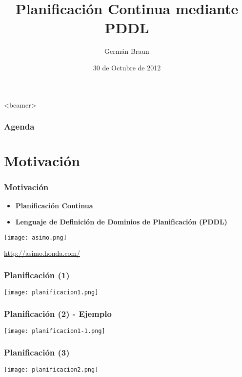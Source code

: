 \documentclass[bigger]{beamer}
\title{Planificación Continua mediante PDDL}
\author{Germán Braun}
\date{30 de Octubre de 2012}
\begin{document}
\maketitle










\begin{frame}<beamer>\frametitle{Agenda}\tableofcontents \end{frame}

\section{Motivación}
\label{sec-1}
\begin{frame}[<+->]
\frametitle{Motivación}
\label{sec-1.1}
\begin{itemize}

\item \textbf{Planificación Continua}\\
\label{sec-1.1.1}%
\item \textbf{Lenguaje de Definición de Dominios de Planificación (PDDL)}\\
\label{sec-1.1.2}%
\end{itemize} %
\label{sec-1.1.3}

\begin{center} \texttt{[image: asimo.png]} \end{center}
\href{http://asimo.honda.com/}{http://asimo.honda.com/}
\end{frame}
\begin{frame}
\frametitle{Planificación (1)}
\label{sec-1.2}

\begin{center} \texttt{[image: planificacion1.png]} \end{center}
\end{frame}
\begin{frame}
\frametitle{Planificación (2) - Ejemplo}
\label{sec-1.3}

\begin{center} \texttt{[image: planificacion1-1.png]} \end{center}
\end{frame}
\begin{frame}
\frametitle{Planificación (3)}
\label{sec-1.4}

\begin{center} \texttt{[image: planificacion2.png]} \end{center}
\end{frame}
\end{document}
